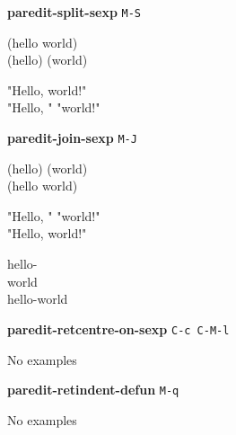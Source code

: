 \documentclass[10pt,landscape,a4paper]{article}
\begin{document}
\begin{multicols}{4}
\textbf{paredit-split-sexp} \texttt{M-S}

{\ttfamily
(hello\cursor{} world)\\
(hello)\cursor{} (world)

"Hello, \cursor world!"\\
"Hello, "\cursor{} "world!"
}

\textbf{paredit-join-sexp} \texttt{M-J}

{\ttfamily
(hello)\cursor{} (world)\\
(hello\cursor{} world)

"Hello, "\cursor{} "world!"\\
"Hello, \cursor world!"

hello-\\
\cursor \space \space world\\
hello-\cursor world
}

\textbf{paredit-retcentre-on-sexp} \texttt{C-c C-M-l}

{\ttfamily
No examples
}

\textbf{paredit-retindent-defun} \texttt{M-q}

{\ttfamily
No examples
}

  \end{multicols}
\end{document}

